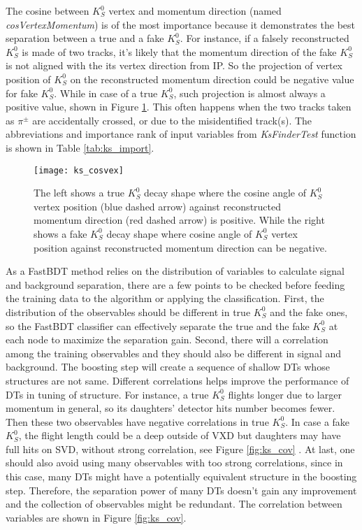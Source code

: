 The cosine between $K_S^0$ vertex and momentum direction (named \textit{cosVertexMomentum}) is of the most importance because it demonstrates the best separation between a true and a fake $K_S^0$. For instance, if a falsely reconstructed $K_S^0$ is made of two tracks, it's likely that the momentum direction of the fake $K_S^0$ is not aligned with the its vertex direction from IP. So the projection of vertex position of $K_S^0$ on the reconstructed momentum direction could be negative value for fake $K_S^0$. While in case of a true $K_S^0$, such projection is almost always a positive value, shown in Figure \ref{fig:ks_cosvex}. This often happens when the two tracks taken as $\pi^{\pm}$ are accidentally crossed, or due to the misidentified track(s). The abbreviations and importance rank of input variables from \textit{KsFinderTest} function is shown in Table \ref{tab:ks_import}.

\begin{figure}[htbp]
	\centering
	\texttt{[image: ks\_cosvex]}
	\caption{The left shows a true $K_S^0$ decay shape where the cosine angle of $K_S^0$ vertex position (blue dashed arrow) against reconstructed momentum direction (red dashed arrow) is positive. While the right shows a fake $K_S^0$ decay shape where cosine angle of $K_S^0$ vertex position against reconstructed momentum direction can be negative. }
	\label{fig:ks_cosvex}
\end{figure}
 
As a FastBDT method relies on the distribution of variables to calculate signal and background separation, there are a few points to be checked before feeding the training data to the algorithm or applying the classification. First, the distribution of the observables should be different in true $K_S^0$ and the fake ones, so the FastBDT classifier can effectively separate the true and the fake $K_S^0$ at each node to maximize the separation gain. Second, there will a correlation among the training observables and they should also be different in signal and background. The boosting step will create a sequence of shallow DTs whose structures are not same. Different correlations helps improve the performance of DTs in tuning of structure. For instance, a true $K_S^0$ flights longer due to larger momentum in general, so its daughters' detector hits number becomes fewer. Then these two observables have negative correlations in true $K_S^0$. In case a fake $K_S^0$, the flight length could be a deep outside of VXD  but daughters may have full hits on SVD, without strong correlation, see Figure  \ref{fig:ks_cov} . At last, one should also avoid using many observables with too strong correlations, since in this case, many DTs might have a potentially equivalent structure in the boosting step. Therefore, the separation power of many DTs doesn't gain any improvement and the collection of observables might be redundant. The correlation between variables are shown in Figure \ref{fig:ks_cov}.

